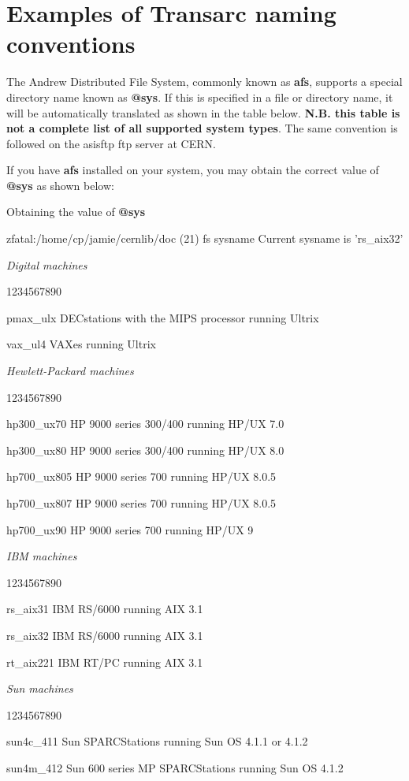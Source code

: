\chapter{Examples of Transarc naming conventions}

The Andrew Distributed File System, commonly known as {\bf afs},
supports a special directory name known as {\bf @sys}. If this
is specified in a file or directory name, it will be automatically
translated as shown in the table below. {\bf N.B. this table
is not a complete list of all supported system types}. The same convention
is followed on the asisftp ftp server at CERN.

If you have {\bf afs} installed on your system, you may obtain the
correct value of {\bf @sys} as shown below:

\begin{XMPt}{Obtaining the value of {\bf @sys}}

zfatal:/home/cp/jamie/cernlib/doc (21) fs sysname
Current sysname is 'rs_aix32'

\end{XMPt}

\label{table-@SYS}

{\it Digital machines}
\begin{DLtt}{1234567890}
\item[pmax\_ulx]DECstations with the MIPS processor running Ultrix
\item[vax\_ul4]VAXes running Ultrix
\end{DLtt}

{\it Hewlett-Packard machines}
\begin{DLtt}{1234567890}
\item[hp300\_ux70]HP 9000 series 300/400 running HP/UX 7.0
\item[hp300\_ux80]HP 9000 series 300/400 running HP/UX 8.0
\item[hp700\_ux805]HP 9000 series 700 running HP/UX 8.0.5
\item[hp700\_ux807]HP 9000 series 700 running HP/UX 8.0.5
\item[hp700\_ux90]HP 9000 series 700 running HP/UX 9
\end{DLtt}

{\it IBM machines}
\begin{DLtt}{1234567890}
\item[rs\_aix31]IBM RS/6000 running AIX 3.1
\item[rs\_aix32]IBM RS/6000 running AIX 3.1
\item[rt\_aix221]IBM RT/PC running AIX 3.1
\end{DLtt}

{\it Sun machines}
\begin{DLtt}{1234567890}
\item[sun4c\_411]Sun SPARCStations running Sun OS 4.1.1 or 4.1.2
\item[sun4m\_412]Sun 600 series MP SPARCStations running Sun OS 4.1.2
\end{DLtt}




